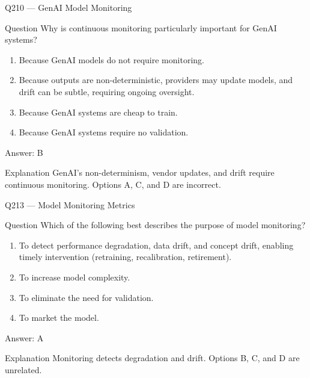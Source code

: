 \documentclass[aspectratio=169,8pt]{beamer}
\begin{document}
																	\begin{frame}{Q210 --- GenAI Model Monitoring}
																		\begin{block}{Question}
																			Why is continuous monitoring particularly important for GenAI systems?
																			\begin{enumerate}
																				\item Because GenAI models do not require monitoring.
																				\item Because outputs are non-deterministic, providers may update models, and drift can be subtle, requiring ongoing oversight.
																				\item Because GenAI systems are cheap to train.
																				\item Because GenAI systems require no validation.
																			\end{enumerate}  \end{block}
																			\begin{exampleblock}{Answer: B}\end{exampleblock}
																			\begin{block}{Explanation}
																				GenAI's non-determinism, vendor updates, and drift require continuous monitoring. Options A, C, and D are incorrect.
																			\end{block}
																		\end{frame}
																		
																	



\begin{frame}{Q213 --- Model Monitoring Metrics}
\begin{block}{Question}
Which of the following best describes the purpose of model monitoring?
\begin{enumerate}
\item To detect performance degradation, data drift, and concept drift, enabling timely intervention (retraining, recalibration, retirement).
\item To increase model complexity.
\item To eliminate the need for validation.
\item To market the model.
\end{enumerate}  \end{block}
\begin{exampleblock}{Answer: A}\end{exampleblock}
\begin{block}{Explanation}
Monitoring detects degradation and drift. Options B, C, and D are unrelated.
\end{block}
\end{frame}
\end{document}
